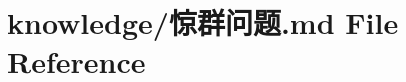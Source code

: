 \hypertarget{_xE6_x83_x8A_xE7_xBE_xA4_xE9_x97_xAE_xE9_xA2_x98_8md}{}\section{knowledge/惊群问题.md File Reference}
\label{_xE6_x83_x8A_xE7_xBE_xA4_xE9_x97_xAE_xE9_xA2_x98_8md}
